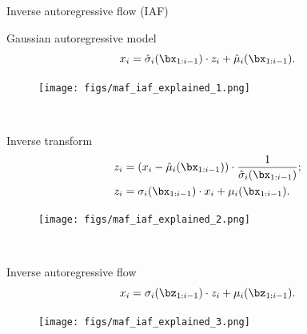\begin{frame}{Inverse autoregressive flow (IAF)}

	\begin{minipage}[t]{0.65\columnwidth}
		\begin{block}{Gaussian autoregressive model}
			\[
			x_i = \hat{\sigma}_i (\bx_{1:i-1}) \cdot z_i + \hat{\mu}_i(\bx_{1:i-1}).
			\]
		\end{block}
	\end{minipage}%
	\begin{minipage}[t]{0.35\columnwidth}
		\begin{figure}[h]
			\centering
			\texttt{[image: figs/maf\_iaf\_explained\_1.png]}
		\end{figure}
	\end{minipage} \\
	
	\begin{minipage}[t]{0.65\columnwidth}
		\begin{block}{Inverse transform}
			\vspace{-0.5cm}
			\begin{align*}
				z_i &= (x_i - \hat{\mu}_i(\bx_{1:i-1})) \cdot \frac{1}{\hat{\sigma}_i (\bx_{1:i-1}) }; \\
				z_i &= \sigma_i (\bx_{1:i-1}) \cdot x_i + \mu_i(\bx_{1:i-1}).
			\end{align*}
			\vspace{-0.4cm}
		\end{block}
	\end{minipage}%
	\begin{minipage}[t]{0.35\columnwidth}
		\begin{figure}[h]
			\centering
			\texttt{[image: figs/maf\_iaf\_explained\_2.png]}
		\end{figure}
	\end{minipage}\\
	\vspace{0.1cm}
	
	\begin{minipage}[t]{0.65\columnwidth}
		\begin{block}{Inverse autoregressive flow}
			\[
			x_i = \sigma_i (\bz_{1:i-1}) \cdot z_i + \mu_i(\bz_{1:i-1}).
			\]
		\end{block}
	\end{minipage}%
	\begin{minipage}[t]{0.35\columnwidth}
		\begin{figure}[h]
			\centering
			\texttt{[image: figs/maf\_iaf\_explained\_3.png]}
		\end{figure}
	\end{minipage}
	
\end{frame}
